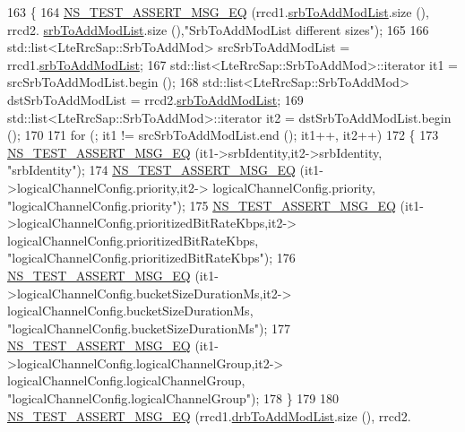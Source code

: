 \begin{DoxyCode}
163 \{
164   \hyperlink{group__testing_ga2a9d78cffb3db8e867c35fff0b698cf5}{NS\_TEST\_ASSERT\_MSG\_EQ} (rrcd1.\hyperlink{structns3_1_1LteRrcSap_1_1RadioResourceConfigDedicated_ae5fcfd17974bfa04fce84b6ba46cb47b}{srbToAddModList}.size (), rrcd2.
      \hyperlink{structns3_1_1LteRrcSap_1_1RadioResourceConfigDedicated_ae5fcfd17974bfa04fce84b6ba46cb47b}{srbToAddModList}.size (),\textcolor{stringliteral}{"SrbToAddModList different sizes"});
165 
166   std::list<LteRrcSap::SrbToAddMod> srcSrbToAddModList = rrcd1.\hyperlink{structns3_1_1LteRrcSap_1_1RadioResourceConfigDedicated_ae5fcfd17974bfa04fce84b6ba46cb47b}{srbToAddModList};
167   std::list<LteRrcSap::SrbToAddMod>::iterator it1 = srcSrbToAddModList.begin ();
168   std::list<LteRrcSap::SrbToAddMod> dstSrbToAddModList = rrcd2.\hyperlink{structns3_1_1LteRrcSap_1_1RadioResourceConfigDedicated_ae5fcfd17974bfa04fce84b6ba46cb47b}{srbToAddModList};
169   std::list<LteRrcSap::SrbToAddMod>::iterator it2 = dstSrbToAddModList.begin ();
170 
171   \textcolor{keywordflow}{for} (; it1 != srcSrbToAddModList.end (); it1++, it2++)
172     \{
173       \hyperlink{group__testing_ga2a9d78cffb3db8e867c35fff0b698cf5}{NS\_TEST\_ASSERT\_MSG\_EQ} (it1->srbIdentity,it2->srbIdentity, \textcolor{stringliteral}{"srbIdentity"});
174       \hyperlink{group__testing_ga2a9d78cffb3db8e867c35fff0b698cf5}{NS\_TEST\_ASSERT\_MSG\_EQ} (it1->logicalChannelConfig.priority,it2->
      logicalChannelConfig.priority, \textcolor{stringliteral}{"logicalChannelConfig.priority"});
175       \hyperlink{group__testing_ga2a9d78cffb3db8e867c35fff0b698cf5}{NS\_TEST\_ASSERT\_MSG\_EQ} (it1->logicalChannelConfig.prioritizedBitRateKbps,it2->
      logicalChannelConfig.prioritizedBitRateKbps, \textcolor{stringliteral}{"logicalChannelConfig.prioritizedBitRateKbps"});
176       \hyperlink{group__testing_ga2a9d78cffb3db8e867c35fff0b698cf5}{NS\_TEST\_ASSERT\_MSG\_EQ} (it1->logicalChannelConfig.bucketSizeDurationMs,it2->
      logicalChannelConfig.bucketSizeDurationMs, \textcolor{stringliteral}{"logicalChannelConfig.bucketSizeDurationMs"});
177       \hyperlink{group__testing_ga2a9d78cffb3db8e867c35fff0b698cf5}{NS\_TEST\_ASSERT\_MSG\_EQ} (it1->logicalChannelConfig.logicalChannelGroup,it2->
      logicalChannelConfig.logicalChannelGroup, \textcolor{stringliteral}{"logicalChannelConfig.logicalChannelGroup"});
178     \}
179 
180   \hyperlink{group__testing_ga2a9d78cffb3db8e867c35fff0b698cf5}{NS\_TEST\_ASSERT\_MSG\_EQ} (rrcd1.\hyperlink{structns3_1_1LteRrcSap_1_1RadioResourceConfigDedicated_ac9201f61eb6cdcc64064f6be6e04cac8}{drbToAddModList}.size (), rrcd2.

\end{DoxyCode}

